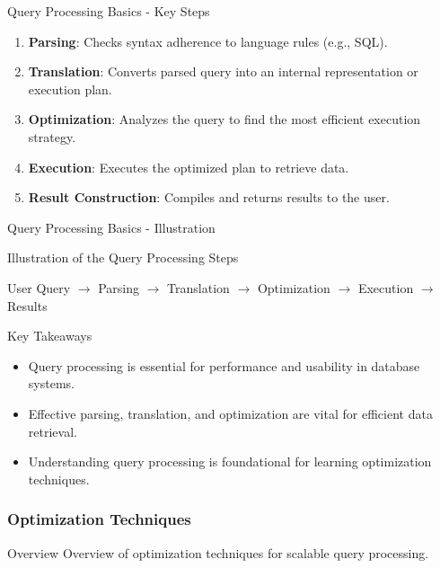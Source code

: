 \documentclass[aspectratio=169]{beamer}
\begin{document}
\begin{frame}[fragile]{Query Processing Basics - Key Steps}
    \begin{enumerate}
        \item \textbf{Parsing}: Checks syntax adherence to language rules (e.g., SQL).
        \item \textbf{Translation}: Converts parsed query into an internal representation or execution plan.
        \item \textbf{Optimization}: Analyzes the query to find the most efficient execution strategy.
        \item \textbf{Execution}: Executes the optimized plan to retrieve data.
        \item \textbf{Result Construction}: Compiles and returns results to the user.
    \end{enumerate}
\end{frame}

\begin{frame}[fragile]{Query Processing Basics - Illustration}
    \begin{block}{Illustration of the Query Processing Steps}
        \begin{center}
            User Query $\rightarrow$ Parsing $\rightarrow$ Translation $\rightarrow$ Optimization $\rightarrow$ Execution $\rightarrow$ Results
        \end{center}
    \end{block}
    
    \begin{block}{Key Takeaways}
        \begin{itemize}
            \item Query processing is essential for performance and usability in database systems.
            \item Effective parsing, translation, and optimization are vital for efficient data retrieval.
            \item Understanding query processing is foundational for learning optimization techniques.
        \end{itemize}
    \end{block}
\end{frame}

\begin{frame}[fragile]
    \frametitle{Optimization Techniques}
    \begin{block}{Overview}
        Overview of optimization techniques for scalable query processing.
    \end{block}
\end{frame}
\end{document}
